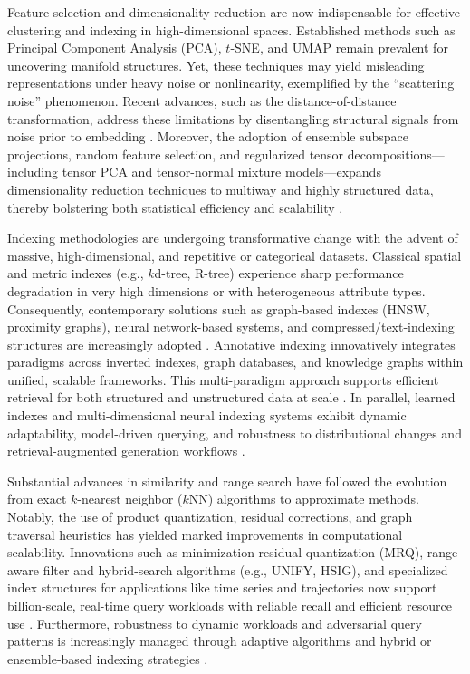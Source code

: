 \documentclass[sigconf]{acmart}
\begin{document}
Feature selection and dimensionality reduction are now indispensable for effective clustering and indexing in high-dimensional spaces. Established methods such as Principal Component Analysis (PCA), $t$-SNE, and UMAP remain prevalent for uncovering manifold structures. Yet, these techniques may yield misleading representations under heavy noise or nonlinearity, exemplified by the ``scattering noise'' phenomenon. Recent advances, such as the distance-of-distance transformation, address these limitations by disentangling structural signals from noise prior to embedding \cite{ref112}. Moreover, the adoption of ensemble subspace projections, random feature selection, and regularized tensor decompositions—including tensor PCA and tensor-normal mixture models—expands dimensionality reduction techniques to multiway and highly structured data, thereby bolstering both statistical efficiency and scalability \cite{ref40,ref88,ref89,ref90}.

Indexing methodologies are undergoing transformative change with the advent of massive, high-dimensional, and repetitive or categorical datasets. Classical spatial and metric indexes (e.g., $k$d-tree, R-tree) experience sharp performance degradation in very high dimensions or with heterogeneous attribute types. Consequently, contemporary solutions such as graph-based indexes (HNSW, proximity graphs), neural network-based systems, and compressed/text-indexing structures are increasingly adopted \cite{ref11,ref23,ref34,ref63,ref70}. Annotative indexing innovatively integrates paradigms across inverted indexes, graph databases, and knowledge graphs within unified, scalable frameworks. This multi-paradigm approach supports efficient retrieval for both structured and unstructured data at scale \cite{ref69}. In parallel, learned indexes and multi-dimensional neural indexing systems exhibit dynamic adaptability, model-driven querying, and robustness to distributional changes and retrieval-augmented generation workflows \cite{ref64,ref65,ref66}.

Substantial advances in similarity and range search have followed the evolution from exact $k$-nearest neighbor ($k$NN) algorithms to approximate methods. Notably, the use of product quantization, residual corrections, and graph traversal heuristics has yielded marked improvements in computational scalability. Innovations such as minimization residual quantization (MRQ), range-aware filter and hybrid-search algorithms (e.g., UNIFY, HSIG), and specialized index structures for applications like time series and trajectories now support billion-scale, real-time query workloads with reliable recall and efficient resource use \cite{ref7,ref12,ref17,ref18,ref22,ref54,ref56,ref61,ref75,ref67,ref70}. Furthermore, robustness to dynamic workloads and adversarial query patterns is increasingly managed through adaptive algorithms and hybrid or ensemble-based indexing strategies \cite{ref53,ref62,ref92}.
\end{document}
